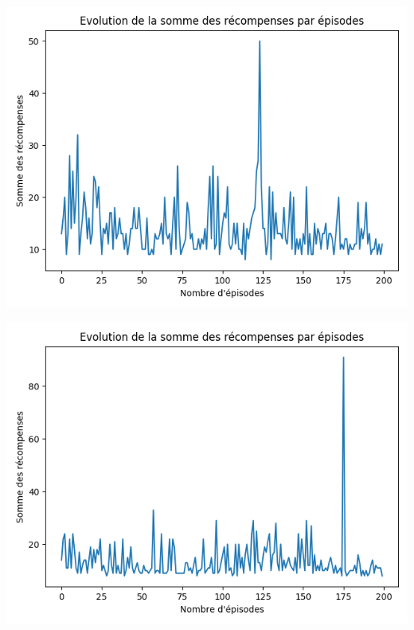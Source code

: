 \documentclass[10pt,a4paper]{article}
\begin{document}
\begin{minipage}{.5\textwidth}
  \centering
  \includegraphics[scale=0.3]{tarnetTanh24.png}
\end{minipage}%
\begin{minipage}{.5\textwidth}
  \centering
  \includegraphics[scale=0.3]{netRelu24.png}
\end{minipage}
\end{document}
